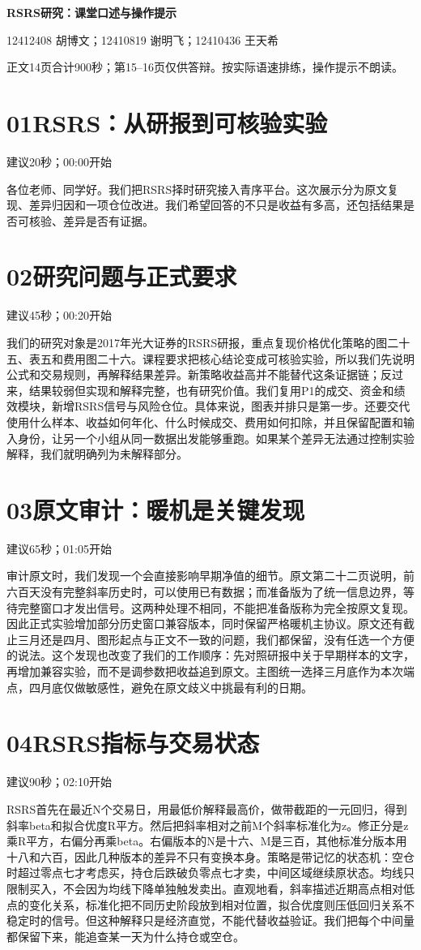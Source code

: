 \documentclass[UTF8,a4paper,11pt]{ctexart}
\begin{document}
{\Large\bfseries\color{ink}RSRS研究：课堂口述与操作提示}\par

12412408 胡博文；12410819 谢明飞；12410436 王天希\par
正文14页合计900秒；第15--16页仅供答辩。按实际语速排练，操作提示不朗读。
\section*{\color{ink}01\quad RSRS：从研报到可核验实验}
{\small\color{accent}建议20秒；00:00开始}\par
各位老师、同学好。我们把RSRS择时研究接入青序平台。这次展示分为原文复现、差异归因和一项仓位改进。我们希望回答的不只是收益有多高，还包括结果是否可核验、差异是否有证据。
\section*{\color{ink}02\quad 研究问题与正式要求}
{\small\color{accent}建议45秒；00:20开始}\par
我们的研究对象是2017年光大证券的RSRS研报，重点复现价格优化策略的图二十五、表五和费用图二十六。课程要求把核心结论变成可核验实验，所以我们先说明公式和交易规则，再解释结果差异。新策略收益高并不能替代这条证据链；反过来，结果较弱但实现和解释完整，也有研究价值。我们复用P1的成交、资金和绩效模块，新增RSRS信号与风险仓位。具体来说，图表并排只是第一步。还要交代使用什么样本、收益如何年化、什么时候成交、费用如何扣除，并且保留配置和输入身份，让另一个小组从同一数据出发能够重跑。如果某个差异无法通过控制实验解释，我们就明确列为未解释部分。
\newpage
\section*{\color{ink}03\quad 原文审计：暖机是关键发现}
{\small\color{accent}建议65秒；01:05开始}\par
审计原文时，我们发现一个会直接影响早期净值的细节。原文第二十二页说明，前六百天没有完整斜率历史时，可以使用已有数据；而准备版为了统一信息边界，等待完整窗口才发出信号。这两种处理不相同，不能把准备版称为完全按原文复现。因此正式实验增加部分历史窗口兼容版本，同时保留严格暖机主协议。原文还有截止三月还是四月、图形起点与正文不一致的问题，我们都保留，没有任选一个方便的说法。这个发现也改变了我们的工作顺序：先对照研报中关于早期样本的文字，再增加兼容实验，而不是调参数把收益追到原文。主图统一选择三月底作为本次端点，四月底仅做敏感性，避免在原文歧义中挑最有利的日期。
\section*{\color{ink}04\quad RSRS指标与交易状态}
{\small\color{accent}建议90秒；02:10开始}\par
RSRS首先在最近N个交易日，用最低价解释最高价，做带截距的一元回归，得到斜率beta和拟合优度R平方。然后把斜率相对之前M个斜率标准化为z。修正分是z乘R平方，右偏分再乘beta。右偏版本的N是十六、M是三百，其他标准分版本用十八和六百，因此几种版本的差异不只有变换本身。策略是带记忆的状态机：空仓时超过零点七才考虑买，持仓后跌破负零点七才卖，中间区域继续原状态。均线只限制买入，不会因为均线下降单独触发卖出。直观地看，斜率描述近期高点相对低点的变化关系，标准化把不同历史阶段放到相对位置，拟合优度则压低回归关系不稳定时的信号。但这种解释只是经济直觉，不能代替收益验证。我们把每个中间量都保留下来，能追查某一天为什么持仓或空仓。
\newpage
\end{document}
